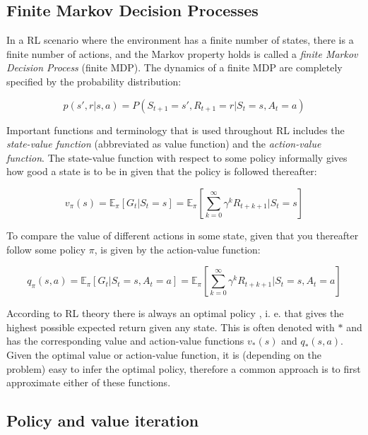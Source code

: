 \subsection{Finite Markov Decision Processes}

In a RL scenario where the environment has a finite number of states, there is
a finite number of actions, and the Markov property holds is called a
\textit{finite Markov Decision Process} (finite MDP). The dynamics of a finite
MDP are completely specified by the probability distribution:

\begin{equation}
    p(s', r|s, a) = P(S_{t+1} = s', R_{t+1} = r | S_t = s, A_t = a)
\end{equation}

Important functions and terminology that is used throughout RL includes the
\textit{state-value function} (abbreviated as value function) and the
\textit{action-value function}. The state-value function with respect to some
policy informally gives how good a state is to be in given that
the policy is followed thereafter:

\begin{equation}
    v_\pi(s) = \mathbb{E}_\pi\left[G_t|S_t=s\right] = \mathbb{E}_\pi\left[\sum_{k=0}^\infty \gamma^k R_{t+k+1}|S_t=s\right]
\end{equation}

To compare the value of different actions in some state, given that you thereafter follow some policy $\pi$,
is given by the action-value function:

\begin{equation}
    q_\pi(s, a) = \mathbb{E}_\pi\left[G_t|S_t=s,A_t=a\right] = \mathbb{E}_\pi\left[\sum_{k=0}^\infty \gamma^k R_{t+k+1}|S_t=s,A_t=a\right]
\end{equation}

According to RL theory there is always an optimal policy
\cite{sniedovich1986new}, i. e. that gives the highest possible expected return
given any state. This is often denoted with $*$ and has the corresponding value
and action-value functions $v_*(s)$ and $q_*(s, a)$. Given the optimal value or
action-value function, it is (depending on the problem) easy to infer the
optimal policy, therefore a common approach is to first approximate either of
these functions.

\subsection{Policy and value iteration}

